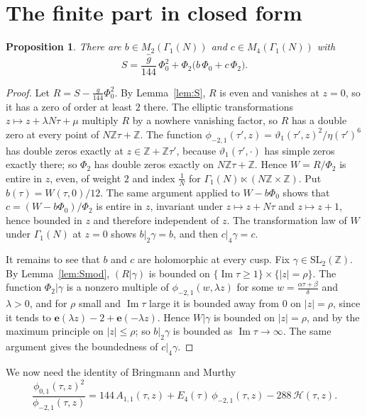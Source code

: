 \documentclass[11pt]{amsart}
\newtheorem{proposition}[theorem]{Proposition}
\theoremstyle{definition}
\newcommand{\ZZ}{\mathbb{Z}}
\newcommand{\e}{\mathbf{e}}
\newcommand{\Hc}{\mathcal{H}}
\newcommand{\gh}{\hat g}
\newcommand{\SL}{\mathrm{SL}_2(\ZZ)}
\begin{document}
\section{The finite part in closed form}\label{sec:closed}

\begin{proposition}\label{prop:structure}
There are $b\in M_2(\Gamma_1(N))$ and $c\in M_4(\Gamma_1(N))$ with
\[
S=\frac{\gh}{144}\,\Phi_0^2+\Phi_2\bigl(b\,\Phi_0+c\,\Phi_2\bigr).
\]
\end{proposition}

\begin{proof}
Let $R=S-\frac{\gh}{144}\Phi_0^2$. By Lemma~\ref{lem:S}, $R$ is even and vanishes at $z=0$, so it has a zero of order at least $2$ there. The elliptic transformations $z\mapsto z+\lambda N\tau+\mu$ multiply $R$ by a nowhere vanishing factor, so $R$ has a double zero at every point of $N\ZZ\tau+\ZZ$. The function $\phi_{-2,1}(\tau',z)=\vartheta_1(\tau',z)^2/\eta(\tau')^6$ has double zeros exactly at $z\in\ZZ+\ZZ\tau'$, because $\vartheta_1(\tau',\cdot)$ has simple zeros exactly there; so $\Phi_2$ has double zeros exactly on $N\ZZ\tau+\ZZ$. Hence $W=R/\Phi_2$ is entire in $z$, even, of weight $2$ and index $\frac1N$ for $\Gamma_1(N)\ltimes(N\ZZ\times\ZZ)$. Put $b(\tau)=W(\tau,0)/12$. The same argument applied to $W-b\Phi_0$ shows that $c=(W-b\Phi_0)/\Phi_2$ is entire in $z$, invariant under $z\mapsto z+N\tau$ and $z\mapsto z+1$, hence bounded in $z$ and therefore independent of $z$. The transformation law of $W$ under $\Gamma_1(N)$ at $z=0$ shows $b|_2\gamma=b$, and then $c|_4\gamma=c$.

It remains to see that $b$ and $c$ are holomorphic at every cusp. Fix $\gamma\in\SL$. By Lemma~\ref{lem:Smod}, $(R|\gamma)$ is bounded on $\{\operatorname{Im}\tau\ge1\}\times\{|z|=\rho\}$. The function $\Phi_2|\gamma$ is a nonzero multiple of $\phi_{-2,1}(w,\lambda z)$ for some $w=\frac{\alpha\tau+\beta}\delta$ and $\lambda>0$, and for $\rho$ small and $\operatorname{Im}\tau$ large it is bounded away from $0$ on $|z|=\rho$, since it tends to $\e(\lambda z)-2+\e(-\lambda z)$. Hence $W|\gamma$ is bounded on $|z|=\rho$, and by the maximum principle on $|z|\le\rho$; so $b|_2\gamma$ is bounded as $\operatorname{Im}\tau\to\infty$. The same argument gives the boundedness of $c|_4\gamma$.
\end{proof}

We now need the identity of Bringmann and Murthy \cite[\S3]{BM13}
\begin{equation}\label{eq:BM}
\frac{\phi_{0,1}(\tau,z)^2}{\phi_{-2,1}(\tau,z)}=144\,A_{1,1}(\tau,z)+E_4(\tau)\,\phi_{-2,1}(\tau,z)-288\,\Hc(\tau,z).
\end{equation}
\end{document}
